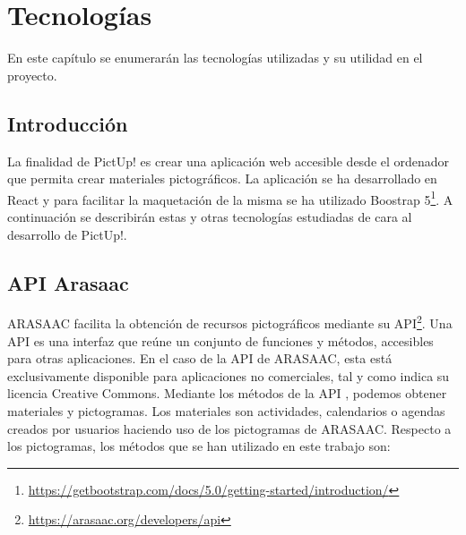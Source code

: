 \chapter{Tecnologías}
\label{cap:introduccion}


\begin{resumen}
	En este capítulo se enumerarán las tecnologías utilizadas y su utilidad en el proyecto.
\end{resumen}

\label{cap1:sec:Motivacion}


\section{Introducción}

La finalidad de PictUp! es crear una aplicación web accesible desde el ordenador que permita crear materiales pictográficos. La aplicación se ha desarrollado en React y para facilitar la maquetación de la misma se ha utilizado Boostrap 5\footnote{\url{https://getbootstrap.com/docs/5.0/getting-started/introduction/}}. 
A continuación se describirán estas y otras tecnologías estudiadas de cara al desarrollo de PictUp!.


\section{API Arasaac}
ARASAAC facilita la obtención de recursos pictográficos mediante su API\footnote{\url{https://arasaac.org/developers/api}}. Una API es una interfaz que reúne un conjunto de funciones y métodos, accesibles para otras aplicaciones. En el caso de la API de ARASAAC, esta está exclusivamente disponible para aplicaciones no comerciales, tal y como indica su licencia Creative Commons.
Mediante los métodos de la API , podemos obtener materiales y pictogramas. Los materiales  son actividades, calendarios o agendas creados por usuarios haciendo uso de los pictogramas de ARASAAC. Respecto a los pictogramas, los métodos que se han utilizado en este trabajo son:

